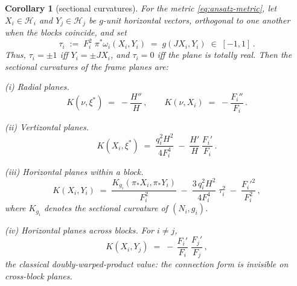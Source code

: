 \documentclass[11pt]{amsart}
\theoremstyle{plain}
\numberwithin{equation}{section}
\newtheorem{corollary}[theorem]{Corollary}
\theoremstyle{definition}
\theoremstyle{remark}
\begin{document}
\begin{corollary}[sectional curvatures]\label{cor:sectional-curvatures}
	For the metric \eqref{eq:ansatz-metric}, let $X_i \in \mathcal{H}_i$ and $Y_j \in \mathcal{H}_j$ be $g$-unit horizontal vectors, orthogonal to one another when the blocks coincide, and set	
	\[
	\tau_i \;:=\; F_i^2\; \pi^*\omega_i(X_i, Y_i) \;=\; g(J X_i, Y_i) \;\in\; [-1, 1] \,.
	\]
	Thus, $\tau_i = \pm 1$ iff $Y_i = \pm J X_i$, and $\tau_i = 0$ iff the plane is totally real. Then the sectional curvatures of the frame planes are:
	
	\emph{(i) Radial planes.}
	\[
	K(\nu, \xi^*) \;=\; -\frac{H''}{H} \,, \qquad K(\nu, X_i) \;=\; -\frac{F_i''}{F_i} \,.
	\]
	
	\emph{(ii) Vertizontal planes.}
	\[
	K(X_i, \xi^*) \;=\; \frac{q_i^2 H^2}{4 F_i^4} \;-\; \frac{H'}{H}\,\frac{F_i'}{F_i} \,.
	\]
	
	\emph{(iii) Horizontal planes within a block.}
		\[
	K(X_i, Y_i) \;=\; \frac{K_{g_i}(\pi_* X_i, \pi_* Y_i)}{F_i^2} \;-\; \frac{3\, q_i^2 H^2}{4 F_i^4}\;\tau_i^2 \;-\; \frac{F_i'^2}{F_i^2} \,,
	\]
		where $K_{g_i}$ denotes the sectional curvature of $(N_i, g_i)$.
	
	\emph{(iv) Horizontal planes across blocks.} For $i \neq j$,
	\[
	K(X_i, Y_j) \;=\; -\,\frac{F_i'}{F_i}\;\frac{F_j'}{F_j} \,,
	\]
		the classical doubly-warped-product value: the connection form is invisible on cross-block planes.
	
	
\end{corollary}
\end{document}
